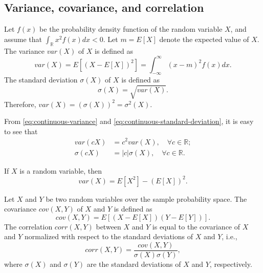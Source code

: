 \subsection{Variance, covariance, and correlation}
\begin{definition}
    Let $ f(x) $ be the probability density function of the random variable
        $ X $, and assume that $ \int_{\mathbb{R}} x^2 f(x) dx < 0 $.
    Let $ m = E[X] $ denote the expected value of $ X $.
    The variance $ var(X) $ of $ X $ is defined as
    \begin{equation}
        var(X) = E[(X - E[X])^2] = \int_{-\infty}^{\infty} (x - m)^2 f(x) dx.
        \label{eq:continuous-variance}
    \end{equation}
    The standard deviation $ \sigma(X) $ of $ X $ is defined as
    \begin{equation}
        \sigma(X) = \sqrt{var(X)}.
        \label{eq:continuous-standard-deviation}
    \end{equation}
    Therefore, $ var(X) = (\sigma(X))^2 = \sigma^2(X) $.
\end{definition}

From \eqref{eq:continuous-variance} and
    \eqref{eq:continuous-standard-deviation}, it is easy to see that
\begin{align}
    var(c X) &= c^2 var(X), \quad \forall c \in \mathbb{R}; \\
    \sigma(c X) &= |c| \sigma(X), \quad \forall c \in \mathbb{R}.
\end{align}

\begin{lemma}
    If $ X $ is a random variable, then
    \begin{equation*}
        var(X) = E[X^2] - (E[X])^2.
    \end{equation*}
\end{lemma}

\begin{definition}
    Let $ X $ and $ Y $ be two random variables over the sample probability
        space.
    The covariance $ cov(X, Y) $ of $ X $ and $ Y $ is defined as
    \begin{equation}
        cov(X, Y) = E[(X - E[X]) (Y - E[Y])].
        \label{eq:continuous-covariance}
    \end{equation}
    The correlation $ corr(X, Y) $ between $ X $ and $ Y $ is equal to the
        covariance of $ X $ and $ Y $ normalized with respect to the standard
        deviations of $ X $ and $ Y $, i.e.,
    \begin{equation}
        corr(X, Y) = \frac{cov(X, Y)}{\sigma(X) \sigma(Y)},
        \label{eq:continuous-correlation}
    \end{equation}
    where $ \sigma(X) $ and $ \sigma(Y) $ are the standard deviations of $ X $
        and $ Y $, respectively.
\end{definition}

